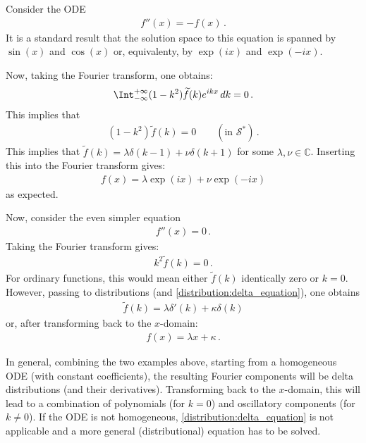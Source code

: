     \begin{example}
        Consider the ODE
        \begin{gather*}
            f''(x) = -f(x)\,.
        \end{gather*}
        It is a standard result that the solution space to this equation is spanned by $\sin(x)$ and $\cos(x)$ or, equivalenty, by $\exp(ix)$ and $\exp(-ix)$.

        Now, taking the Fourier transform, one obtains:
        \begin{gather*}
            \Int_{-\infty}^{+\infty}(1-k^2)\widetilde{f}(k)e^{ikx}\,dk=0\,.
        \end{gather*}
        This implies that
        \begin{gather*}
            (1-k^2)\widetilde{f}(k)=0\qquad(\text{in }\mathcal{S}^*)\,.
        \end{gather*}
        This implies that $\widetilde{f}(k)=\lambda\delta(k-1)+\nu\delta(k+1)$ for some $\lambda,\nu\in\mathbb{C}$. Inserting this into the Fourier transform gives:
        \begin{gather}
            f(x) = \lambda\exp(ix)+\nu\exp(-ix)
        \end{gather}
        as expected.
    \end{example}

    \begin{example}
        Now, consider the even simpler equation
        \begin{gather*}
            f''(x) = 0\,.
        \end{gather*}
        Taking the Fourier transform gives:
        \begin{gather}
            k^2\widetilde{f}(k)=0\,.
        \end{gather}
        For ordinary functions, this would mean either $\widetilde{f}(k)$ identically zero or $k=0$. However, passing to distributions (and \cref{distribution:delta_equation}), one obtains
        \begin{gather*}
            \widetilde{f}(k) = \lambda\delta'(k) + \kappa\delta(k)
        \end{gather*}
        or, after transforming back to the $x$-domain:
        \begin{gather*}
            f(x) = \lambda x+\kappa\,.
        \end{gather*}
    \end{example}
    In general, combining the two examples above, starting from a homogeneous ODE (with constant coefficients), the resulting Fourier components will be delta distributions (and their derivatives). Transforming back to the $x$-domain, this will lead to a combination of polynomials (for $k=0$) and oscillatory components (for $k\neq0$). If the ODE is not homogeneous, \cref{distribution:delta_equation} is not applicable and a more general (distributional) equation has to be solved.

